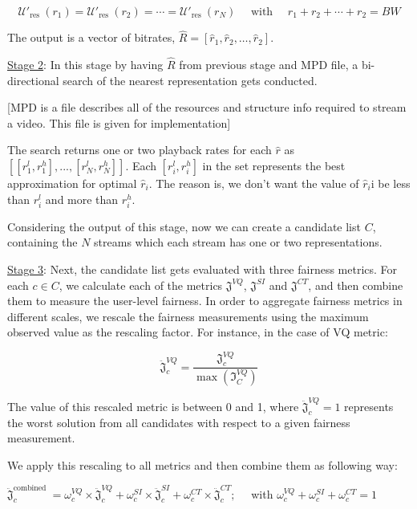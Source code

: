 \documentclass{article}
\begin{document}
\begin{equation}
\mathcal{U\prime}_{\text {res }}\left(r_{1}\right)=\mathcal{U\prime}_{\text {res }}\left(r_{2}\right)=\cdots=\mathcal{U\prime}_{\text {res }}\left(r_{N}\right) \quad \text { with } \quad r_{1}+r_{2}+\cdots+r_{2}=B W
\end{equation}

The output is a vector of bitrates, $\hat{R}=\left[\hat{r}_{1}, \hat{r}_{2}, \ldots, \hat{r}_{2}\right]$.

\underline{Stage 2}: In this stage by having $\hat{R}$ from previous stage and MPD file, a bi-directional search of the nearest representation gets conducted. 

[MPD is a file describes all of the resources and structure info required to stream a video. This file is given for implementation]

The search returns one or two playback rates for each $\hat{r}$ as $[[r_1^l,r_1^h ],...,[r_N^l,r_N^h ]]$. Each $[r_i^l,r_i^h]$ in the set represents the best approximation for optimal $\hat{r}_i$. The reason is, we don’t want the value of $\hat{r}_i$i be less than $r_i^l$ and more than $r_i^h$. 

Considering the output of this stage, now we can create a candidate list $C$, containing the $N$ streams which each stream has one or two representations.

\underline{Stage 3}: Next, the candidate list gets evaluated with three fairness metrics. For each $c\in C$, we calculate each of the metrics $\mathfrak{J}^{V Q}$, $\mathfrak{J}^{S I}$ and $\mathfrak{J}^{C T}$, and then combine them to measure the user-level fairness. In order to aggregate fairness metrics in different scales, we rescale the fairness measurements using the maximum observed value as the rescaling factor. For instance, in the case of VQ metric:

\begin{equation}
\ddot{\mathfrak{J}}_{c}^{V Q}=\frac{\mathfrak{J}_{c}^{V Q}}{\max \left(\mathfrak{I}_{C}^{V Q}\right)}
\end{equation}

The value of this rescaled metric is between 0 and 1, where $\ddot{\mathfrak{J}}_{c}^{V Q}=1$ represents the worst solution from all candidates with respect to a given fairness measurement. 

We apply this rescaling to all metrics and then combine them as following way:

$\ddot{\mathfrak{J}}_{c}^{\text {combined }}=\omega_{c}^{V Q} \times \ddot{\mathfrak{J}}_{c}^{V Q}+\omega_{c}^{S I} \times \ddot{\mathfrak{J}}_{c}^{S I}+\omega_{c}^{C T} \times \ddot{\mathfrak{J}}_{c}^{C T} ; \quad$ with $\omega_{c}^{V Q}+\omega_{c}^{S I}+\omega_{c}^{C T}=1$
\end{document}
